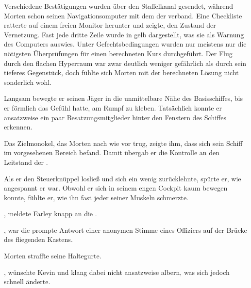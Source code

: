 Verschiedene Bestätigungen wurden über den Staffelkanal gesendet, während Morten schon seinen Navigationsomputer mit dem der  verband. Eine Checkliste ratterte auf einem freien Monitor herunter und zeigte, den Zustand der Vernetzung. Fast jede dritte Zeile wurde in gelb dargestellt, was sie als Warnung des Computers auswies. Unter Gefechtsbedingungen wurden nur meistens nur die nötigsten Überprüfungen für einen berechneten Kurs durchgeführt. Der Flug durch den flachen Hyperraum war zwar deutlich weniger gefährlich als durch sein tieferes Gegenstück, doch fühlte sich Morten mit der berechneten Lösung nicht sonderlich wohl.

\par

Langsam bewegte er seinen Jäger in die unmittelbare Nähe des Basisschiffes, bis er förmlich das Gefühl hatte, am Rumpf zu kleben. Tatsächlich konnte er ansatzweise ein paar Besatzungsmitglieder hinter den Fenstern des Schiffes erkennen.

\par

Das Zielmonokel, das Morten nach wie vor trug, zeigte ihm, dass sich sein Schiff im vorgesehenen Bereich befand. Damit übergab er die Kontrolle an den Leitstand der .

\par

Als er den Steuerknüppel losließ und sich ein wenig zurücklehnte, spürte er, wie angespannt er war. Obwohl er sich in seinem engen Cockpit kaum bewegen konnte, fühlte er, wie ihn fast jeder seiner Muskeln schmerzte.

\par

, meldete Farley knapp an die .

\par

, war die prompte Antwort einer anonymen Stimme eines Offiziers auf der Brücke des fliegenden Kastens. 

\par

Morten straffte seine Haltegurte.

\par

, wünschte Kevin und klang dabei nicht ansatzweise albern, was sich jedoch schnell änderte. 

